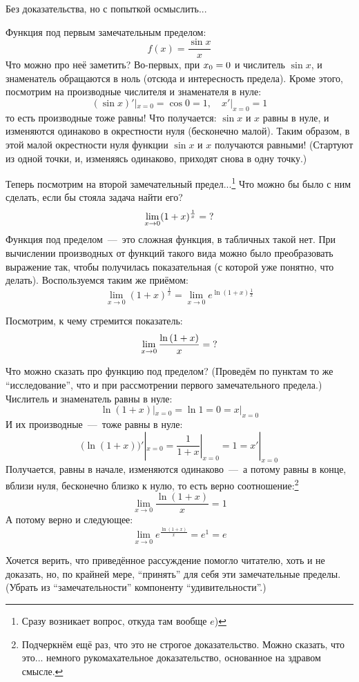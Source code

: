 \documentclass[a4paper,12pt]{article}
\begin{document}
  Без доказательства, но с попыткой осмыслить...

  \begin{remark}
    Функция под первым замечательным пределом:
    \[
      f(x) = \frac{\sin x}{x}
    \]
    Что можно про неё заметить?
    Во-первых, при $x_0 \hm= 0$ и числитель $\sin x$, и знаменатель обращаются в ноль (отсюда и интересность предела).
    Кроме этого, посмотрим на производные числителя и знаменателя в нуле:
    \[
      (\sin x)'|_{x = 0} = \cos 0 = 1,\quad x'|_{x = 0} = 1
    \]
    то есть производные тоже равны!
    Что получается: $\sin x$ и $x$ равны в нуле, и изменяются одинаково в окрестности нуля (бесконечно малой).
    Таким образом, в этой малой окрестности нуля функции $\sin x$ и $x$ получаются равными!
    (Стартуют из одной точки, и, изменяясь одинаково, приходят снова в одну точку.)
    \medskip

    Теперь посмотрим на второй замечательный предел...\footnote{
      Сразу возникает вопрос, откуда там вообще $e$)
    }
    Что можно бы было с ним сделать, если бы стояла задача найти его?
    \[
      \lim_{x \to 0} (1 + x)^{\frac{1}{x}} = \operatorname{?}
    \]
    Функция под пределом~---~это сложная функция, в табличных такой нет.
    При вычислении производных от функций такого вида можно было преобразовать выражение так, чтобы получилась показательная (с которой уже понятно, что делать).
    Воспользуемся таким же приёмом:
    \[
      \lim_{x \to 0} (1 + x)^{\frac{1}{x}}
        = \lim_{x \to 0} e^{\ln{(1 + x)} \frac{1}{x}}
    \]

    Посмотрим, к чему стремится показатель:
    \[
      \lim_{x \to 0} \frac{\ln{(1 + x)}}{x} = \operatorname{?}
    \]

    Что можно сказать про функцию под пределом?
    (Проведём по пунктам то же ``исследование'', что и при рассмотрении первого замечательного предела.)
    Числитель и знаменатель равны в нуле:
    \[
      \ln{(1 + x)}|_{x = 0} = \ln{1} = 0 = x|_{x = 0}
    \]
    И их производные~---~тоже равны в нуле:
    \[
      \bigl(\ln{(1 + x)}\bigr)'|_{x = 0} = \left.\frac{1}{1 + x}\right|_{x = 0} = 1 = x'|_{x = 0}
    \]
    Получается, равны в начале, изменяются одинаково~---~а потому равны в конце, вблизи нуля, бесконечно близко к нулю, то есть верно соотношение:\footnote{
      Подчеркнём ещё раз, что это не строгое доказательство.
      Можно сказать, что это... немного рукомахательное доказательство, основанное на здравом смысле.
    }
    \[
      \lim_{x \to 0} \frac{\ln{(1 + x)}}{x} = 1
    \]
    А потому верно и следующее:
    \[
      \lim_{x \to 0} e^{\frac{\ln{(1 + x)}}{x}} = e^1 = e
    \]

    \medskip

    Хочется верить, что приведённое рассуждение помогло читателю, хоть и не доказать, но, по крайней мере, ``принять'' для себя эти замечательные пределы.
    (Убрать из ``замечательности'' компоненту ``удивительности''.)
  \end{remark}
\end{document}
